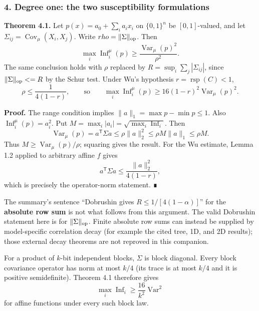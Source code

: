 \subsubsection{4. Degree one: the two susceptibility formulations}\label{degree-one-the-two-susceptibility-formulations}

\textbf{Theorem 4.1.} Let \(p(x)=a_0+\sum_i a_ix_i\) on \(\{0,1\}^n\) be \([0,1]\)-valued, and let \(\Sigma_{ij}=\operatorname{Cov}_\mu(X_i,X_j)\). Write \(\rho=\|\Sigma\|_{\rm op}\). Then
\[\max_i\operatorname{Inf}_i^\mu(p)\ge\frac{\operatorname{Var}_\mu(p)^2}{\rho^2}.\]
The same conclusion holds with \(\rho\) replaced by \(R=\sup_i\sum_j|\Sigma_{ij}|\), since \(\|\Sigma\|_{\rm op}\le R\) by the Schur test. Under Wu's hypothesis \(r=\operatorname{rsp}(C)<1\),
\[\rho\le\frac{1}{4(1-r)},\qquad\text{so}\qquad
\max_i\operatorname{Inf}_i^\mu(p)\ge16(1-r)^2\operatorname{Var}_\mu(p)^2.\]

\textbf{Proof.} The range condition implies \(\|a\|_1=\max p-\min p\le1\). Also \(\operatorname{Inf}_i^\mu(p)=a_i^2\). Put \(M=\max_i|a_i|=\sqrt{\max_i\operatorname{Inf}_i}\). Then
\[
\operatorname{Var}_\mu(p)=a^{\mathsf T}\Sigma a
\le\rho\|a\|_2^2
\le\rho M\|a\|_1
\le\rho M.
\]
Thus \(M\ge\operatorname{Var}_\mu(p)/\rho\); squaring gives the result.
For the Wu estimate, Lemma 1.2 applied to arbitrary affine \(f\) gives
\[a^{\mathsf T}\Sigma a\le\frac{\|a\|_2^2}{4(1-r)},\]
which is precisely the operator-norm statement. ∎

The summary's sentence ``Dobrushin gives \(R\le1/[4(1-\alpha)]\)'' for the \textbf{absolute row sum} is not what follows from this argument. The valid Dobrushin statement here is for \(\|\Sigma\|_{\rm op}\). Finite absolute row sums can instead be supplied by model-specific correlation decay (for example the cited tree, 1D, and 2D results); those external decay theorems are not reproved in this companion.

For a product of \(k\)-bit independent blocks, \(\Sigma\) is block diagonal. Every block covariance operator has norm at most \(k/4\) (its trace is at most \(k/4\) and it is positive semidefinite). Theorem 4.1 therefore gives
\[\max_i\operatorname{Inf}_i\ge\frac{16}{k^2}\operatorname{Var}^2\]
for affine functions under every such block law.
